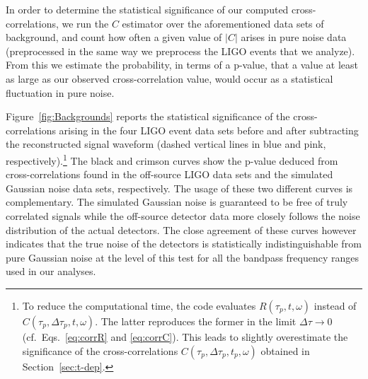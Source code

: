 \documentclass[a4paper,11pt]{article}
\begin{document}
In order to determine the statistical significance of our computed cross-correlations, we run the $C$ estimator over the aforementioned data sets of background, and count how often a given value of $|C|$ arises in pure noise data (preprocessed in the same way we preprocess the LIGO events that we analyze). From this we estimate the probability, in terms of a p-value, that a value at least as large as our observed cross-correlation value, would occur as a statistical fluctuation in pure noise.

Figure~\ref{fig:Backgrounds} reports the statistical significance of the cross-correlations arising in the four LIGO event data sets before and after subtracting the reconstructed signal waveform  (dashed vertical lines in blue and pink, respectively).\footnote{To reduce the computational time, the code  evaluates $R(\tau_p, t, \omega)$ instead of $C(\tau_p, \Delta \tau_p, t, \omega)$. The latter reproduces the former in the limit $\Delta \tau \to 0$ (cf.~Eqs.~\eqref{eq:corrR} and \eqref{eq:corrC}). This leads to slightly overestimate the significance of the cross-correlations $C(\tau_p, \Delta \tau_p, t_p, \omega)$ obtained in Section~\ref{sec:t-dep}.}
%
The black and crimson curves show the p-value deduced from  cross-correlations found in the off-source LIGO data sets and the simulated Gaussian noise data sets, respectively. 
The usage of these two different curves is complementary. The simulated Gaussian noise is guaranteed to be free of truly correlated signals while the off-source detector data more closely follows the noise distribution of the actual detectors.
The close agreement of these curves however indicates that the true noise of the detectors is statistically indistinguishable from pure Gaussian noise at the level of this test for all the bandpass frequency ranges used in our analyses.
\end{document}
